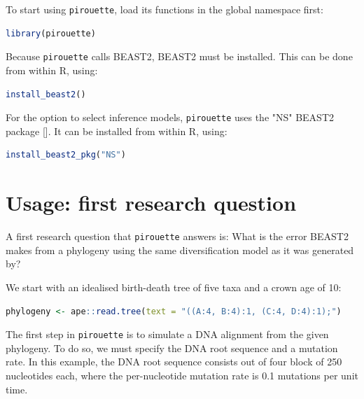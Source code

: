 \documentclass{article}
\begin{document}
To start using \verb;pirouette;, load its functions in the global namespace first:

\begin{lstlisting}[language=R, floatplacement=H, frame=single]
library(pirouette)
\end{lstlisting}
Because \verb;pirouette; calls BEAST2, BEAST2 must be installed. 
This can be done from within R, using:

\begin{lstlisting}[language=R, floatplacement=H, frame=single]
install_beast2()
\end{lstlisting}
For the option to select inference models,
\verb;pirouette; uses the "NS" BEAST2 package [\cite{maturana2018model}].
It can be installed from within R, using:

\begin{lstlisting}[language=R, floatplacement=H, frame=single]
install_beast2_pkg("NS")
\end{lstlisting}

\section{Usage: first research question}

A first research question that \verb;pirouette; answers is:
What is the error BEAST2 makes from a phylogeny using the same 
diversification model as it was generated by?

We start with an idealised birth-death tree of five taxa and a crown age of 10:

\begin{lstlisting}[language=R, floatplacement=H, frame=single]
phylogeny <- ape::read.tree(text = "((A:4, B:4):1, (C:4, D:4):1);")
\end{lstlisting}

The first step in \verb;pirouette; is to simulate a DNA alignment from the 
given phylogeny. To do so, we must specify the DNA root sequence
and a mutation rate. In this example, the DNA root sequence consists
out of four block of 250 nucleotides each, where the per-nucleotide
mutation rate is 0.1 mutations per unit time.
\end{document}
